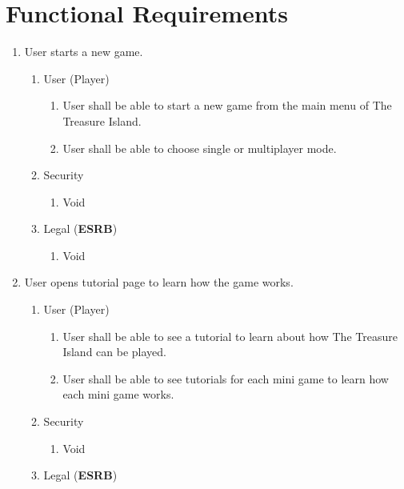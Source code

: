 \documentclass[]{article}
\begin{document}
\section{Functional Requirements}
\label{sec:functional_requirements}


\begin{enumerate}[{BE}1.]
	\item User starts a new game.
	\begin{enumerate}[{VP1}.1]
		\item User (Player)
			\begin{enumerate}
				\item User shall be able to start a new game from the main menu of The Treasure Island.
				\item User shall be able to choose single or multiplayer mode.
			\end{enumerate}
		\item Security
			\begin{enumerate}
				\item Void
			\end{enumerate}
		\item Legal (\textbf{ESRB})
			\begin{enumerate}
				\item Void
			\end{enumerate}
	\end{enumerate}
	\item User opens tutorial page to learn how the game works.
	\begin{enumerate}[{VP2}.1]
		\item User (Player)
			\begin{enumerate}
				\item User shall be able to see a tutorial to learn about how The Treasure Island can be played.
				\item User shall be able to see tutorials for each mini game to learn how each mini game works.
			\end{enumerate}
		\item Security
			\begin{enumerate}
				\item Void
			\end{enumerate}
		\item Legal (\textbf{ESRB})
			\begin{enumerate}

\end{enumerate}
\end{enumerate}
\end{enumerate}
\end{document}
